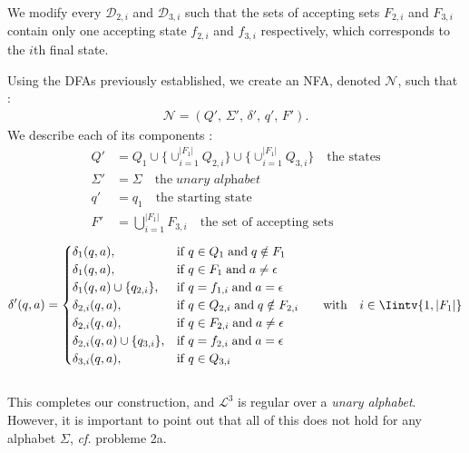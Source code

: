 \documentclass{article}
\begin{document}
We modify every $\mathcal{D}_{2,i}$ and $\mathcal{D}_{3,i}$ such that the sets of accepting sets $F_{2,i}$ and $F_{3,i}$ contain only one accepting state $f_{2,i}$ and $f_{3,i}$ respectively, which corresponds to the $i$th final state.

Using the DFAs previously established, we create an NFA, denoted $\mathcal{N}$, such that :
\begin{align*}
    \mathcal{N}=(Q',\, \Sigma',\, \delta',\, q',\, F').
\end{align*}
We describe each of its components :
\begin{align*}
    Q'&=Q_1\cup \{\cup_{i=1}^{\lvert F_1\rvert}Q_{2,i}\}\cup \{\cup_{i=1}^{\lvert F_1\rvert}Q_{3,i}\}\quad\text{the states}\\
    \Sigma'&=\Sigma\quad\text{the}\;\textit{unary alphabet}\\
    q'&=q_1\quad\text{the starting state}\\
    F'&=\bigcup_{i=1}^{\lvert F_1\rvert}F_{3,i}\quad\text{the set of accepting sets}
\end{align*}
\begin{equation*}
    \delta'(q, a)=
    \begin{cases}
      \delta_1(q, a), & \text{if}\ q\in Q_1\;\text{and}\;q\notin F_1\\
      \delta_1(q, a), & \text{if}\ q\in F_1\;\text{and}\;a\neq\epsilon\\
      \delta_1(q, a)\cup\{q_{2,i}\}, & \text{if}\ q=f_{1,i}\;\text{and}\;a=\epsilon\\
      \delta_{2,i}(q, a), & \text{if}\ q\in Q_{2,i}\;\text{and}\;q\notin F_{2,i}\quad\quad\text{with}\quad i\in\Iintv{1,\lvert F_1\rvert}\\
      \delta_{2,i}(q, a), & \text{if}\ q\in F_{2,i}\;\text{and}\;a\neq\epsilon\\
      \delta_{2,i}(q, a)\cup\{q_{3,i}\}, & \text{if}\ q=f_{2,i}\;\text{and}\;a=\epsilon\\
      \delta_{3,i}(q, a), & \text{if}\ q\in Q_{3,i}\\
    \end{cases}
  \end{equation*}
  \\
  This completes our construction, and $\mathcal{L}^3$ is regular over a \textit{unary alphabet}. \\
  However, it is important to point out that all of this does not hold for any alphabet $\Sigma$, \textit{cf.} probleme 2a.
  \\\\
\end{document}
